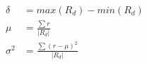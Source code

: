 \documentclass{article}
\begin{document}
	\begin{align*}
		\delta &= max(R_d) - min(R_d) \\[4pt]
		\mu &= \frac{\sum
			r}{|R_d|} \\[4pt] 
	\sigma^2 &= \frac{\sum
		(r-\mu)^2}{|R_d|}
\end{align*}
\end{document}
